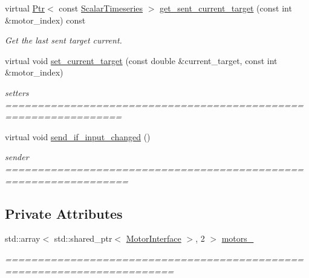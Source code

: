 \begin{DoxyCompactItemize}
virtual \hyperlink{classblmc__drivers_1_1LegInterface_ac5af9e6514abff5ee918813925a8e42d}{Ptr}$<$ const \hyperlink{classblmc__drivers_1_1LegInterface_a57a35b64a76fb4225637828d1b1c35a6}{Scalar\+Timeseries} $>$ \hyperlink{classblmc__drivers_1_1Leg_a94760dbfc66ba22e68dfa8d89eec4c9f}{get\+\_\+sent\+\_\+current\+\_\+target} (const int \&motor\+\_\+index) const
\begin{DoxyCompactList}\small\item\em Get the last sent target current. \end{DoxyCompactList}\item 
\mbox{\label{classblmc__drivers_1_1Leg_a05415969ef111f86837b34bdaecb7320}} 
virtual void \hyperlink{classblmc__drivers_1_1Leg_a05415969ef111f86837b34bdaecb7320}{set\+\_\+current\+\_\+target} (const double \&current\+\_\+target, const int \&motor\+\_\+index)
\begin{DoxyCompactList}\small\item\em setters ================================================================ \end{DoxyCompactList}\item 
\mbox{\label{classblmc__drivers_1_1Leg_a82bb681e4c5047babf699cff559e9488}} 
virtual void \hyperlink{classblmc__drivers_1_1Leg_a82bb681e4c5047babf699cff559e9488}{send\+\_\+if\+\_\+input\+\_\+changed} ()
\begin{DoxyCompactList}\small\item\em sender ================================================================= \end{DoxyCompactList}\end{DoxyCompactItemize}
\subsection*{Private Attributes}
\begin{DoxyCompactItemize}
\item 
std\+::array$<$ std\+::shared\+\_\+ptr$<$ \hyperlink{classblmc__drivers_1_1MotorInterface}{Motor\+Interface} $>$, 2 $>$ \hyperlink{classblmc__drivers_1_1Leg_a78289d4c19fc35dbc3e7dd849e57479e}{motors\+\_\+}
\begin{DoxyCompactList}\small\item\em ======================================================================== \end{DoxyCompactList}\end{DoxyCompactItemize}
